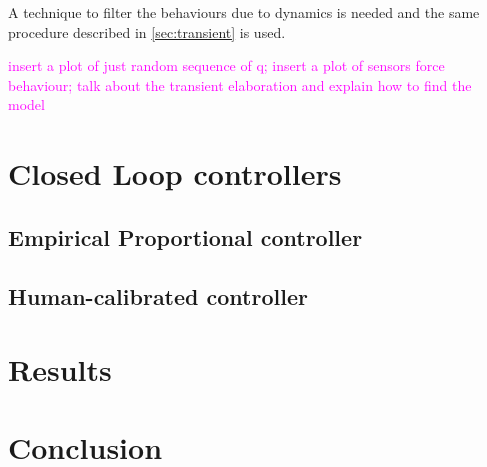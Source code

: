 A technique to filter the behaviours due to dynamics is needed and the same procedure described in \ref{sec:transient} is used. 

\textcolor{magenta}{insert a plot of just random sequence of q; insert a plot of sensors force behaviour; talk about the transient elaboration and explain how to find the model}

\chapter{Closed Loop controllers}


\section{Empirical Proportional controller}
\section{Human-calibrated controller}
\chapter{Results}

\chapter*{Conclusion}
